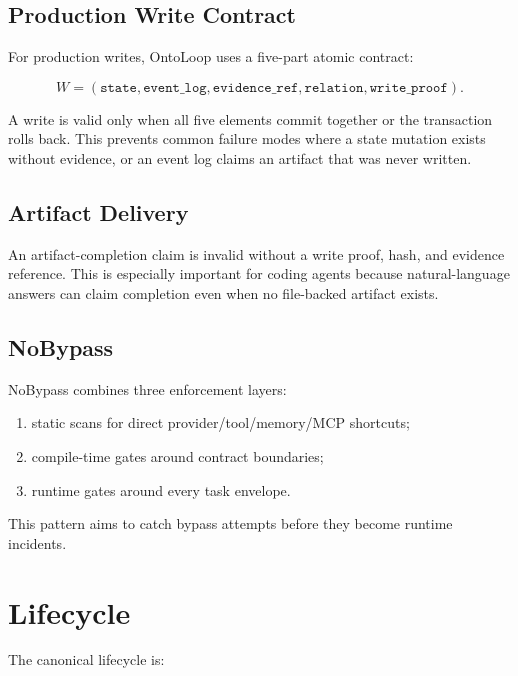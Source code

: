 \documentclass[11pt]{article}
\begin{document}
\subsection{Production Write Contract}

For production writes, OntoLoop uses a five-part atomic contract:

\[
  W = (\texttt{state}, \texttt{event\_log}, \texttt{evidence\_ref},
       \texttt{relation}, \texttt{write\_proof}).
\]

A write is valid only when all five elements commit together or the transaction
rolls back. This prevents common failure modes where a state mutation exists
without evidence, or an event log claims an artifact that was never written.

\subsection{Artifact Delivery}

An artifact-completion claim is invalid without a write proof, hash, and evidence
reference. This is especially important for coding agents because natural-language
answers can claim completion even when no file-backed artifact exists.

\subsection{NoBypass}

NoBypass combines three enforcement layers:

\begin{enumerate}
  \item static scans for direct provider/tool/memory/MCP shortcuts;
  \item compile-time gates around contract boundaries;
  \item runtime gates around every task envelope.
\end{enumerate}

This pattern aims to catch bypass attempts before they become runtime incidents.

\section{Lifecycle}

The canonical lifecycle is:
\end{document}

